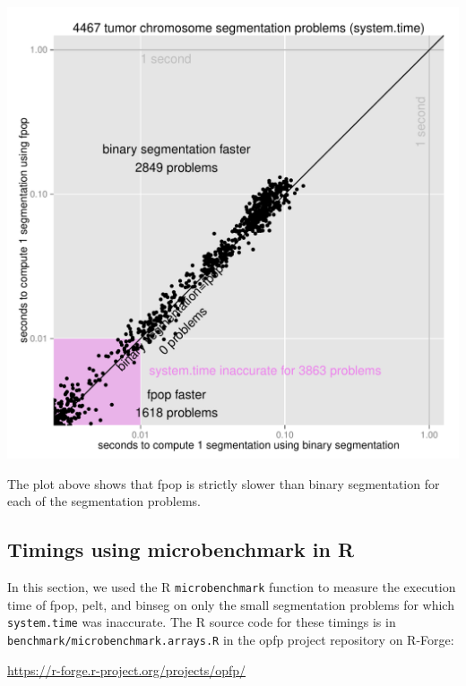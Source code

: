 \documentclass{article}
\begin{document}
\begin{center}
  \includegraphics[width=\textwidth]{figure-systemtime-arrays-fpop-multiBinSeg}
\end{center}

The plot above shows that fpop is strictly slower than binary
segmentation for each of the segmentation problems.

\subsection{Timings using microbenchmark in R}

In this section, we used the R \verb|microbenchmark| function to
measure the execution time of fpop, pelt, and binseg on only the small
segmentation problems for which \verb|system.time| was inaccurate. The
R source code for these timings is in
\verb|benchmark/microbenchmark.arrays.R| in the opfp project
repository on R-Forge:

\url{https://r-forge.r-project.org/projects/opfp/}
\end{document}
